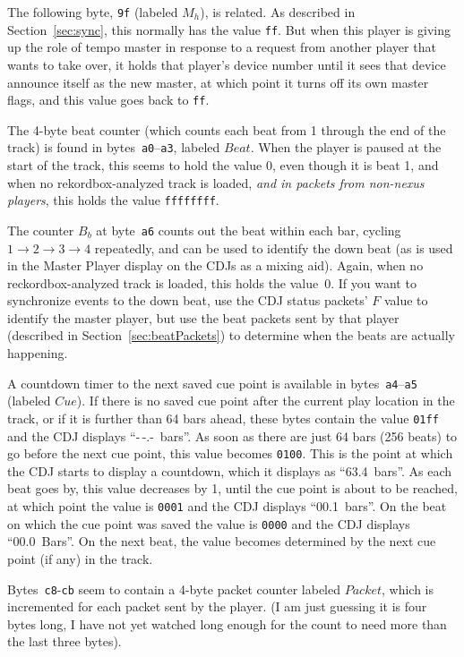 \documentclass[11pt]{article}
\begin{document}
The following byte, {\tt 9f} (labeled $M_h$), is related. As described
in Section~\ref{sec:sync}, this normally has the value {\tt ff}. But
when this player is giving up the role of tempo master in response to
a request from another player that wants to take over, it holds that
player's device number until it sees that device announce itself as
the new master, at which point it turns off its own master flags, and
this value goes back to {\tt ff}.

The 4-byte beat counter (which counts each beat from 1 through the end
of the track) is found in bytes~{\tt a0}--{\tt a3}, labeled $Beat$.
When the player is paused at the start of the track, this seems to
hold the value 0, even though it is beat 1, and when no
rekordbox-analyzed track is loaded, \emph{and in packets from
  non-nexus players}, this holds the value {\tt ffffffff}.

The counter $B_b$ at byte~{\tt a6} counts out the beat within each bar,
cycling $1\to2\to3\to4$ repeatedly, and can be used to identify the
down beat (as is used in the Master Player display on the CDJs as a
mixing aid). Again, when no reckordbox-analyzed track is loaded, this
holds the value~0. If you want to synchronize events to the down beat,
use the CDJ status packets' $F$ value to identify the master player,
but use the beat packets sent by that player (described in
Section~\ref{sec:beatPackets}) to determine when the beats are
actually happening.

A countdown timer to the next saved cue point is available in
bytes~{\tt a4}--{\tt a5} (labeled $Cue$). If there is no saved cue
point after the current play location in the track, or if it is
further than 64 bars ahead, these bytes contain the value {\tt 01ff}
and the CDJ displays ``-\,-.-~bars''. As soon as there are just 64
bars (256 beats) to go before the next cue point, this value becomes
{\tt 0100}. This is the point at which the CDJ starts to display a
countdown, which it displays as ``63.4~bars''. As each beat goes by,
this value decreases by 1, until the cue point is about to be reached,
at which point the value is {\tt 0001} and the CDJ displays
``00.1~bars''. On the beat on which the cue point was saved the value
is {\tt 0000} and the CDJ displays ``00.0~Bars''. On the next beat,
the value becomes determined by the next cue point (if any) in the
track.

Bytes~{\tt c8}-{\tt cb} seem to contain a 4-byte packet counter
labeled $Packet$, which is incremented for each packet sent by the
player. (I am just guessing it is four bytes long, I have not yet
watched long enough for the count to need more than the last three
bytes).
\end{document}
